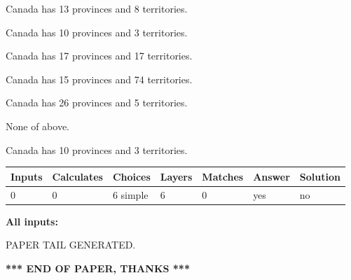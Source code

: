 \documentclass[12pt]{article}
\begin{document}
 
Canada has  13 provinces and  8 territories.
 
 
Canada has 10  provinces and 3 territories.
 
 
Canada has  17 provinces and  17 territories.
 
 
Canada has  15 provinces and  74 territories.
 
 
Canada has  26 provinces and  5 territories.
 
 
 None of above.
 
 
\noindent{}
 
 
Canada has 10  provinces and 3 territories.
 
 
\noindent{}
 
 
   
   
   
   
\noindent\begin{tabular}{|l|l|l|l|l|l|l|}
 \hline
Inputs & Calculates & Choices & Layers & Matches & Answer & Solution \\ \hline
 0  & 
 0  & 
 6
  simple  
  & 
 6  & 
 0  & 
  yes & 
  no 
  \\ \hline
 \end{tabular}
   
   
   
   
\noindent{}
   
   
   
   
\noindent\vspace{0.1in}\hspace{-0.08in} {\textbf{\Large{All inputs: }}}
   
   
   
   
   
   
 \vspace{0.2in}
 
   
   
\vspace{2.0in} PAPER TAIL GENERATED.
   
   
   
   
\vspace{1.0in} 
{\textbf{\large{ *** END OF PAPER, THANKS *** }}} 
   
\end{document}
